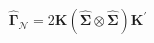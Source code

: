 \begin{equation}
    \hat{\boldsymbol{\Gamma}}_{\mathcal{N}}
    =
    2
    \mathbf{K}
    \left(
    \hat{\boldsymbol{\Sigma}}
    \otimes
    \hat{\boldsymbol{\Sigma}}
    \right)
    \mathbf{K}^{\prime}
    \label{eq:gammaMatrix-gammacap-mvn-estimator}   
\end{equation}
